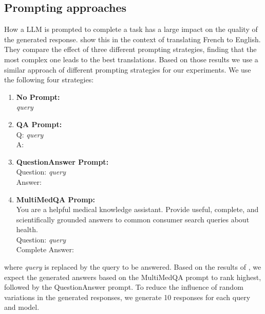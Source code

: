\subsection{Prompting approaches}\label{sec:prompting-approaches}
How a LLM is prompted to complete a task has a large impact on the quality of the generated response.
\cite{reynolds:2021:Prompt} show this in the context of translating French to English.
They compare the effect of three different prompting strategies, finding that the most complex one leads to the best translations.
Based on those results we use a similar approach of different prompting strategies for our experiments.
We use the following four strategies:
\begin{enumerate}
    \item \textbf{No Prompt:}\\ \textit{query}
    \item \textbf{QA Prompt:}\\ Q: \textit{query}\\A:
    \item \textbf{QuestionAnswer Prompt:}\\ Question: \textit{query}\\Answer:
    \item \textbf{MultiMedQA Promp:}\\ You are a helpful medical knowledge assistant. Provide useful, complete, and scientifically grounded answers to common consumer search queries about health.\\Question: \textit{query}\\Complete Answer:
\end{enumerate}
where \textit{query} is replaced by the query to be answered.
Based on the results of \cite{reynolds:2021:Prompt}, we expect the generated answers based on the MultiMedQA prompt to rank highest, followed by the QuestionAnswer prompt.
To reduce the influence of random variations in the generated responses, we generate 10 responses for each query and model.

